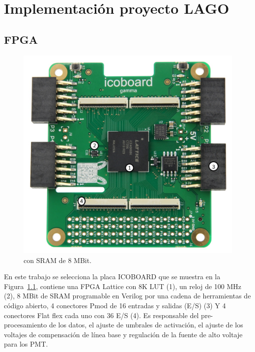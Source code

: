 \chapter{Implementación proyecto LAGO}
\section{FPGA}

\begin{figure}[h]
\includegraphics[scale=0.18]{Figs/icoboard.jpg} 
\centering
\caption[Icoboard con Lattice iCE40 de Trenz Electronic]{ con SRAM de 8 MBit.~\citep{IcoBoard}}
\label{icoboard}
\end{figure}

En este trabajo se selecciona la placa ICOBOARD que se muestra en la Figura~\ref{icoboard},  contiene una FPGA Lattice con 8K LUT (1), un reloj de 100 MHz (2), 8 MBit de SRAM programable en Verilog por una cadena de herramientas de código abierto, 4 conectores Pmod de 16 entradas y salidas (E/S) (3) Y 4 conectores Flat flex cada uno con 36 E/S (4). Es responsable del pre-procesamiento de los datos, el ajuste de umbrales de activación, el ajuste de los voltajes de compensación de línea base y regulación de la fuente de alto voltaje para los PMT.




